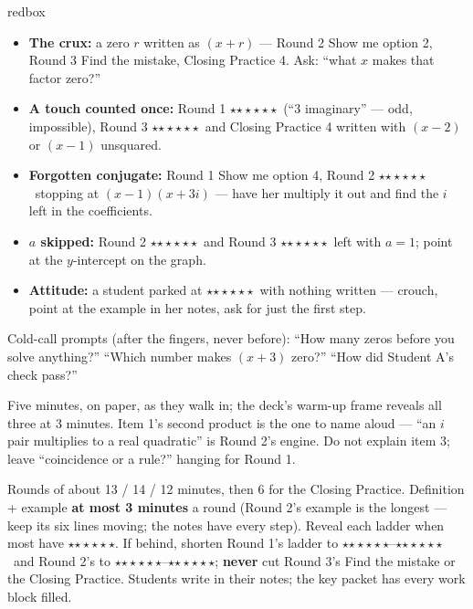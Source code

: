 \documentclass[10pt]{article}
\newcommand{\rung}[1]{{\color{goldacc}\ifcase#1\or$\star$\or$\star\star$\or$\star\star\star$\fi}}
\begin{document}
\boxguard
\begin{skillbox}{redbox}
\begin{itemize}[leftmargin=1.2em, nosep]
  \item \textbf{The crux:} a zero $r$ written as $(x+r)$ --- Round 2 Show me option 2, Round 3
        Find the mistake, Closing Practice 4. Ask: ``what $x$ makes that factor zero?''
  \item \textbf{A touch counted once:} Round 1 \rung3\ (``$3$ imaginary'' --- odd, impossible),
        Round 3 \rung3\ and Closing Practice 4 written with $(x-2)$ or $(x-1)$ unsquared.
  \item \textbf{Forgotten conjugate:} Round 1 Show me option 4, Round 2 \rung2\ stopping at
        $(x-1)(x+3i)$ --- have her multiply it out and find the $i$ left in the coefficients.
  \item \textbf{$a$ skipped:} Round 2 \rung3\ and Round 3 \rung3\ left with $a=1$; point at
        the $y$-intercept on the graph.
  \item \textbf{Attitude:} a student parked at \rung1\ with nothing written --- crouch, point at
        the example in her notes, ask for just the first step.
\end{itemize}
Cold-call prompts (after the fingers, never before): ``How many zeros before you solve
anything?'' \; ``Which number makes $(x+3)$ zero?'' \; ``How did Student A's check pass?''
\end{skillbox}

\begin{teachernote}[Warm-Up]
Five minutes, on paper, as they walk in; the deck's warm-up frame reveals all three at 3
minutes. Item 1's second product is the one to name aloud --- ``an $i$ pair multiplies to a real
quadratic'' is Round 2's engine. Do not explain item 3; leave ``coincidence or a rule?'' hanging
for Round 1.
\end{teachernote}

\begin{teachernote}
Rounds of about 13 / 14 / 12 minutes, then 6 for the Closing Practice. Definition + example
\textbf{at most 3 minutes} a round (Round 2's example is the longest --- keep its six lines moving;
the notes have every step). Reveal each ladder when most have \rung2. If behind, shorten Round 1's
ladder to \rung1--\rung2\ and Round 2's to \rung1--\rung2; \textbf{never} cut Round 3's Find the
mistake or the Closing Practice. Students write in their notes; the key packet has every work
block filled.
\end{teachernote}
\end{document}

